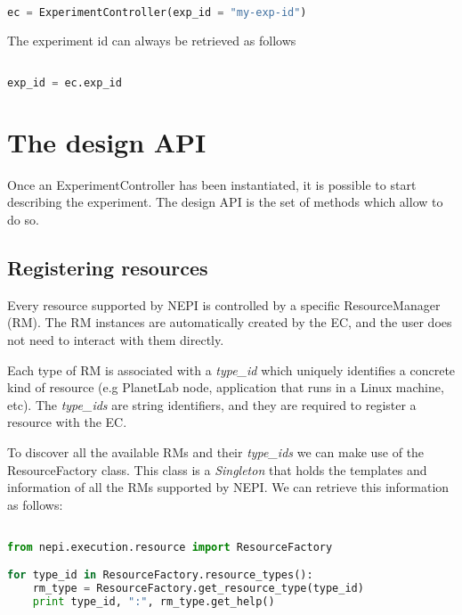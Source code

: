 \begin{lstlisting}[language=Python]

ec = ExperimentController(exp_id = "my-exp-id")

\end{lstlisting}

The experiment id can always be retrieved as follows

\begin{lstlisting}[language=Python]

exp_id = ec.exp_id 

\end{lstlisting}


\section{The design API}

Once an ExperimentController has been instantiated, it is possible to start
describing the experiment. The design API is the set of methods which
allow to do so.

\subsection{Registering resources}

Every resource supported by NEPI is controlled by a specific ResourceManager 
(RM). The RM instances are automatically created by the EC, and the user does 
not need to interact with them directly. 

Each type of RM is associated with a \emph{type\_id} which uniquely identifies 
a concrete kind of resource (e.g PlanetLab node, application that runs in
a Linux machine, etc).
The \emph{type\_ids} are string identifiers, and they are required  
to register a resource with the EC.

To discover all the available RMs and their \emph{type\_ids} we
can make use of the ResourceFactory class.
This class is a \emph{Singleton} that holds the templates and information 
of all the RMs supported by NEPI. We can retrieve this information as follows:

\begin{lstlisting}[language=Python]

from nepi.execution.resource import ResourceFactory

for type_id in ResourceFactory.resource_types():
    rm_type = ResourceFactory.get_resource_type(type_id)
    print type_id, ":", rm_type.get_help()

\end{lstlisting}

